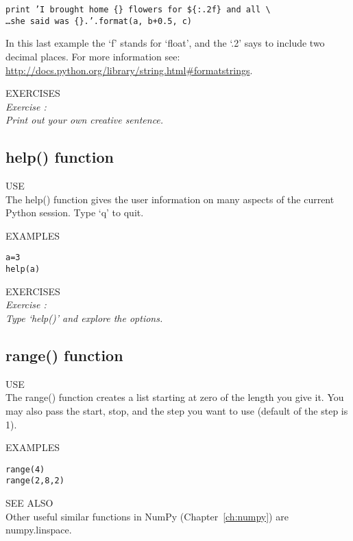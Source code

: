 \texttt{\pytab print 'I brought home \{\} flowers for \$\{:.2f\} and all
  \textbackslash  \\
  \ldots    she said was \{\}.'.format(a, b+0.5, c)}
  
In this last example the `f' stands for `float', and the `.2'
says to include two decimal places.  For more information see: \\
\url{http://docs.python.org/library/string.html#formatstrings}.

{\color{blue} {\sf\small EXERCISES}} \\
{\it Exercise  :  \\
Print out your own creative sentence.}

\subsection{ {\sf help() } function}
{\color{blue} {\sf\small USE}} \\
The {\sf\small help()}  function gives the user information on many
aspects of the current Python session.  Type `q' to quit. 

{\color{blue} {\sf\small EXAMPLES}} 
\begin{alltt}
\pytab a = 3 
\pytab help(a) 
\end{alltt}

{\color{blue} {\sf\small EXERCISES}} \\
{\it Exercise  :  \\
Type `help()' and explore the options.}

\subsection{ {\sf range() } function}
{\color{blue} {\sf\small USE}} \\
The {\sf\small range()} function creates a list starting at zero of
the length you give it.  You may also pass the start, stop, and the
step you want to use (default of the step is 1).

{\color{blue} {\sf\small EXAMPLES}} 
\begin{alltt}
\pytab range(4) 
\pytab range(2, 8, 2) 
\end{alltt}
{\color{blue} {\sf\small SEE ALSO}} \\
Other useful similar functions in NumPy (Chapter~\ref{ch:numpy}) are
{\sf\small numpy.linspace}.

